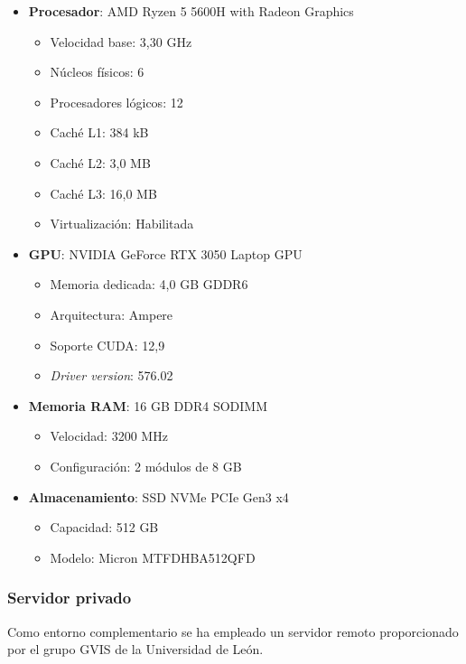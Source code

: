 \documentclass[12pt,a4paper,onecolumn,oneside]{report}
\begin{document}
\begin{itemize}
    \item \textbf{Procesador}: AMD Ryzen 5 5600H with Radeon Graphics
    \begin{itemize}
        \item Velocidad base: 3,30 GHz
        \item Núcleos físicos: 6
        \item Procesadores lógicos: 12
        \item Caché L1: 384 kB
        \item Caché L2: 3,0 MB  
        \item Caché L3: 16,0 MB
        \item Virtualización: Habilitada
    \end{itemize}
    
    \item \textbf{GPU}: NVIDIA GeForce RTX 3050 Laptop GPU
    \begin{itemize}
        \item Memoria dedicada: 4,0 GB GDDR6
        \item Arquitectura: Ampere
        \item Soporte CUDA: 12,9
        \item \textit{Driver version}: 576.02
    \end{itemize}
    
    \item \textbf{Memoria RAM}: 16 GB DDR4 SODIMM
    \begin{itemize}
        \item Velocidad: 3200 MHz
        \item Configuración: 2 módulos de 8 GB
    \end{itemize}
    
    \item \textbf{Almacenamiento}: SSD NVMe PCIe Gen3 x4
    \begin{itemize}
        \item Capacidad: 512 GB
        \item Modelo: Micron MTFDHBA512QFD
    \end{itemize}
\end{itemize}

\subsubsection{Servidor privado}
\label{sec:servidor_privado}
Como entorno complementario se ha empleado un servidor remoto proporcionado por el grupo GVIS de la Universidad de León.
\end{document}
